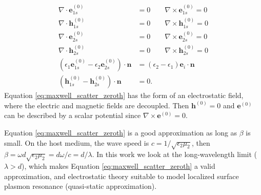 \begin{align} \label{eq:maxwell_scatter_zeroth}
 \nabla \cdot \mathbf{e}^{(0)}_{1s} &= 0 \qquad \nabla \times \mathbf{e}^{(0)}_{1s} = 0 \nonumber \\
 \nabla \cdot \mathbf{h}^{(0)}_{1s} &= 0 \qquad \nabla \times \mathbf{h}^{(0)}_{1s} = 0 \nonumber \\
 \nabla \cdot \mathbf{e}^{(0)}_{2s} &= 0 \qquad \nabla \times \mathbf{e}^{(0)}_{2s} = 0 \nonumber \\
 \nabla \cdot \mathbf{h}^{(0)}_{2s} &= 0 \qquad \nabla \times \mathbf{h}^{(0)}_{2s} = 0 \nonumber \\
 (\epsilon_1\mathbf{e}^{(0)}_{1s} - \epsilon_2\mathbf{e}^{(0)}_{2s})\cdot\mathbf{n} &= (\epsilon_2-\epsilon_1)\mathbf{e}_i\cdot \mathbf{n} \nonumber \\(\mathbf{h}^{(0)}_{1s} - \mathbf{h}^{(0)}_{2s})\cdot \mathbf{n}&=0.
 \end{align}
%
Equation \eqref{eq:maxwell_scatter_zeroth} has the form of an electrostatic field, where the electric
and magnetic fields are decoupled. Then $\mathbf{h}^{(0)}=0$ and $\mathbf{e}^{(0)}$ can be described by a
scalar potential since $\nabla \times \mathbf{e}^{(0)}=0$.
 
Equation \eqref{eq:maxwell_scatter_zeroth} is a good approximation as long as $\beta$ is small. On the host medium, the wave 
speed is $c=1/\sqrt{\epsilon_2\mu_2}$, then $\beta=\omega d \sqrt{\epsilon_2\mu_2} = d\omega/c  = d/\lambda$. In this work
we look at the long-wavelength limit ($\lambda > d$), which makes Equation \eqref{eq:maxwell_scatter_zeroth} 
a valid approximation, and electrostatic theory suitable to model localized surface plasmon resonance (quasi-static approximation).

